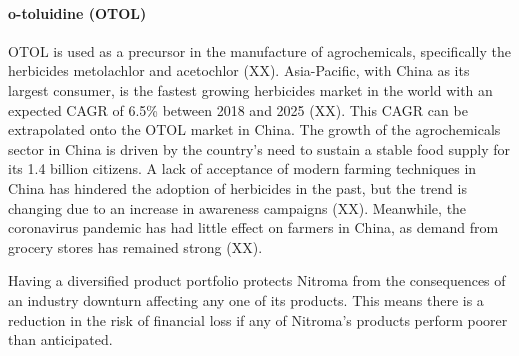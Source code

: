 \paragraph{o-toluidine (OTOL)}
OTOL is used as a precursor in the manufacture of agrochemicals, specifically the herbicides metolachlor and acetochlor (XX). Asia-Pacific, with China as its largest consumer, is the fastest growing herbicides market in the world with an expected CAGR of 6.5\% between 2018 and 2025 (XX). This CAGR can be extrapolated onto the OTOL market in China. The growth of the agrochemicals sector in China is driven by the country’s need to sustain a stable food supply for its 1.4 billion citizens. A lack of acceptance of modern farming techniques in China has hindered the adoption of herbicides in the past, but the trend is changing due to an increase in awareness campaigns (XX). Meanwhile, the coronavirus pandemic has had little effect on farmers in China, as demand from grocery stores has remained strong (XX).

Having a diversified product portfolio protects Nitroma from the consequences of an industry downturn affecting any one of its products. This means there is a reduction in the risk of financial loss if any of Nitroma's products perform poorer than anticipated.

